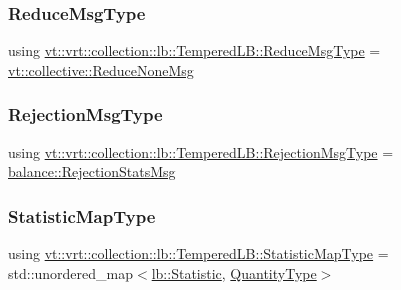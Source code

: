 \subsubsection{\texorpdfstring{Reduce\+Msg\+Type}{ReduceMsgType}}
{\footnotesize\ttfamily using \hyperlink{structvt_1_1vrt_1_1collection_1_1lb_1_1_tempered_l_b_a3e688a286b16334d43666bae581231b7}{vt\+::vrt\+::collection\+::lb\+::\+Tempered\+L\+B\+::\+Reduce\+Msg\+Type} =  \hyperlink{namespacevt_1_1collective_aa439a90f05078f2bcf918641c951946f}{vt\+::collective\+::\+Reduce\+None\+Msg}}

\mbox{\label{structvt_1_1vrt_1_1collection_1_1lb_1_1_tempered_l_b_af1c8105006c9150e33347c66018e143e}} 
\subsubsection{\texorpdfstring{Rejection\+Msg\+Type}{RejectionMsgType}}
{\footnotesize\ttfamily using \hyperlink{structvt_1_1vrt_1_1collection_1_1lb_1_1_tempered_l_b_af1c8105006c9150e33347c66018e143e}{vt\+::vrt\+::collection\+::lb\+::\+Tempered\+L\+B\+::\+Rejection\+Msg\+Type} =  \hyperlink{structvt_1_1vrt_1_1collection_1_1balance_1_1_rejection_stats_msg}{balance\+::\+Rejection\+Stats\+Msg}}

\mbox{\label{structvt_1_1vrt_1_1collection_1_1lb_1_1_tempered_l_b_ad9f4a2ede0929ca64fc6108cc812db33}} 
\subsubsection{\texorpdfstring{Statistic\+Map\+Type}{StatisticMapType}}
{\footnotesize\ttfamily using \hyperlink{structvt_1_1vrt_1_1collection_1_1lb_1_1_tempered_l_b_ad9f4a2ede0929ca64fc6108cc812db33}{vt\+::vrt\+::collection\+::lb\+::\+Tempered\+L\+B\+::\+Statistic\+Map\+Type} =  std\+::unordered\+\_\+map$<$\hyperlink{namespacevt_1_1vrt_1_1collection_1_1lb_af0e20ef9afee77295053aa83bf1348b1}{lb\+::\+Statistic}, \hyperlink{structvt_1_1vrt_1_1collection_1_1lb_1_1_base_l_b_a864b2c437d81680577013741e265ef0d}{Quantity\+Type}$>$}

